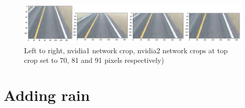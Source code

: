 \begin{figure}[ht]
 \centering 
 \includegraphics[width=\textwidth]{Figures/nvidia1x1_nvidia2x3_crops.png}
 \caption{Left to right, nvidia1 network crop, nvidia2 network crops at top crop set to 70, 81 and 91 pixels respectively)}
 \label{fig:nvidia1x1_nvidia2x3_crops_results} %
\end{figure}



\section{Adding rain}

